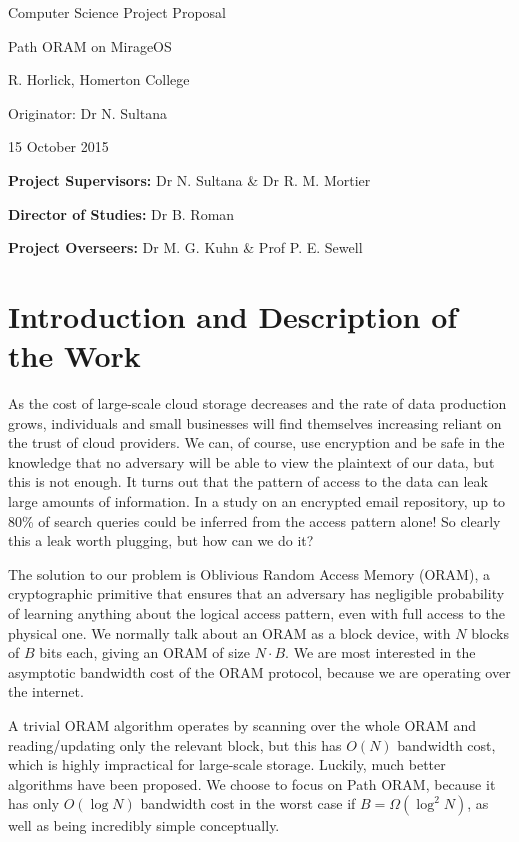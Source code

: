 \documentclass[12pt,a4paper,twoside]{article}
\begin{document}
\vfil

\centerline{\Large Computer Science Project Proposal}
\vspace{0.4in}
\centerline{\Large Path ORAM on MirageOS}
\vspace{0.4in}
\centerline{\large R. Horlick, Homerton College}
\vspace{0.3in}
\centerline{\large Originator: Dr N. Sultana}
\vspace{0.3in}
\centerline{\large 15 October 2015}

\vfil


\noindent
{\bf Project Supervisors:} Dr N. Sultana \& Dr R. M. Mortier
\vspace{0.2in}

\noindent
{\bf Director of Studies:} Dr B. Roman
\vspace{0.2in}
\noindent
 
\noindent
{\bf Project Overseers:} Dr M. G. Kuhn \& Prof P. E. Sewell



\section*{Introduction and Description of the Work}

As the cost of large-scale cloud storage decreases and the rate of data production grows, individuals and small businesses will find themselves increasing reliant on the trust of cloud providers. We can, of course, use encryption and be safe in the knowledge that no adversary will be able to view the plaintext of our data, but this is not enough. It turns out that the pattern of access to the data can leak large amounts of information. In a study on an encrypted email repository, up to 80\% of search queries could be inferred from the access pattern alone! So clearly this a leak worth plugging, but how can we do it?

The solution to our problem is Oblivious Random Access Memory (ORAM), a cryptographic primitive that ensures that an adversary has negligible probability of learning anything about the logical access pattern, even with full access to the physical one. We normally talk about an ORAM as a block device, with $N$ blocks of $B$ bits each, giving an ORAM of size $N \cdot B$. We are most interested in the asymptotic bandwidth cost of the ORAM protocol, because we are operating over the internet.

A trivial ORAM algorithm operates by scanning over the whole ORAM and reading/updating only the relevant block, but this has $O(N)$ bandwidth cost, which is highly impractical for large-scale storage. Luckily, much better algorithms have been proposed. We choose to focus on Path ORAM, because it has only $O(\log N)$ bandwidth cost in the worst case if $B = \Omega(\log^2 N)$, as well as being incredibly simple conceptually.
\end{document}
